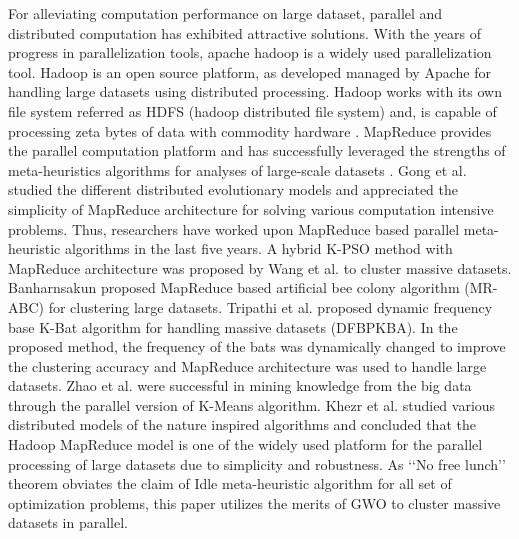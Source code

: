 \documentclass[review]{elsarticle}
\begin{document}
For alleviating computation performance on large dataset, parallel and distributed computation has exhibited attractive solutions. With the years of progress in parallelization tools, apache hadoop is a widely used parallelization tool. Hadoop \cite{shvachko2010hadoop} is an open source platform, as developed managed by Apache for handling large datasets using distributed processing. Hadoop works with its own file system referred as HDFS (hadoop distributed file system) and, is capable of processing zeta bytes of data with commodity hardware \cite{FrontPag86:online} .
MapReduce \cite{dean2008mapreduce}provides the parallel computation platform and has successfully leveraged the strengths of meta-heuristics algorithms for analyses of large-scale datasets \cite{khezr2015mapreduce, wang2012parallel, lin2013parallelizing}. Gong et al. \cite{gong2015distributed} studied the different distributed evolutionary models and appreciated the simplicity of MapReduce architecture for solving various computation intensive problems. Thus, researchers have worked upon MapReduce based parallel meta-heuristic algorithms in the last five years. 
      A hybrid K-PSO method with MapReduce architecture was proposed by Wang et al. \cite{wang2012parallel} to cluster massive datasets.
 Banharnsakun \cite{banharnsakun2016mapreduce} proposed MapReduce based artificial bee colony algorithm (MR-ABC) for clustering large datasets.
Tripathi et al. \cite{tripathidynamic} proposed dynamic frequency base K-Bat algorithm for handling massive datasets (DFBPKBA). In the proposed method, the frequency of the bats was dynamically changed to improve the clustering accuracy and MapReduce architecture was used to handle large datasets. 
  Zhao et al. \cite{zhao2009parallel} were successful in mining knowledge from the big data through the parallel version of K-Means algorithm.
   Khezr et al. \cite{khezr2015mapreduce} studied various distributed models of the nature inspired algorithms and concluded that the Hadoop MapReduce model is one of the widely used platform for the parallel processing of large datasets due to simplicity and robustness. As ‘‘No free lunch’’ theorem \cite{wolpert1997no} obviates the claim of Idle meta-heuristic algorithm for all set of optimization problems, this paper utilizes the merits of GWO to cluster massive datasets in parallel.
\end{document}
